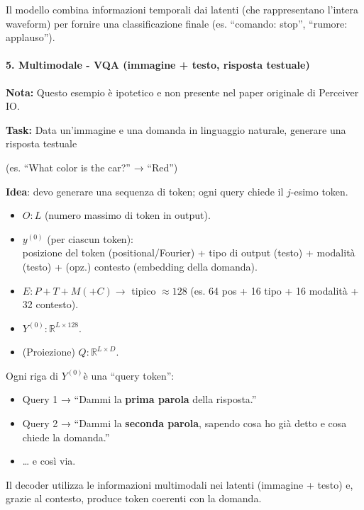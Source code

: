 \documentclass[
  11pt,
]{article}
\begin{document}
Il modello combina informazioni temporali dai latenti (che rappresentano
l'intera waveform) per fornire una classificazione finale (es.
``comando: stop'', ``rumore: applauso'').


\paragraph{5. \textbf{Multimodale - VQA (immagine + testo, risposta testuale)}}

\textbf{Nota:} Questo esempio è ipotetico e non presente nel paper originale di Perceiver IO.

\textbf{Task:} Data un'immagine e una domanda in linguaggio naturale,
generare una risposta testuale

(es. ``What color is the car?'' → ``Red'')

\textbf{Idea}: devo generare una sequenza di token; ogni query chiede il
\(j\)-esimo token.

\begin{itemize}
\item
  \(O:L\) (numero massimo di token in output).
\item
  \(y^{(0)}\) (per ciascun token):\\
  posizione del token (positional/Fourier) + tipo di output (testo) +
  modalità (testo) + (opz.) contesto (embedding della domanda).
\item
  \(E:P + T + M( + C) \rightarrow\) tipico \(\approx 128\) (es. 64 pos +
  16 tipo + 16 modalità + 32 contesto).
\item
  \(Y^{(0)}:\mathbb{R}^{L \times 128}\).
\item
  (Proiezione) \(Q:\mathbb{R}^{L \times D}\).
\end{itemize}

Ogni riga di \(Y^{(0)}\)è una ``query token'':

\begin{itemize}
\item
  Query 1 → ``Dammi la \textbf{prima parola} della risposta.''
\item
  Query 2 → ``Dammi la \textbf{seconda parola}, sapendo cosa ho già
  detto e cosa chiede la domanda.''
\item
  \ldots{} e così via.
\end{itemize}

Il decoder utilizza le informazioni multimodali nei latenti (immagine +
testo) e, grazie al contesto, produce token coerenti con la domanda.
\end{document}
